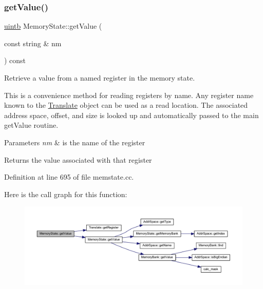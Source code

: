 \subsubsection{\texorpdfstring{getValue()}{getValue()}\hspace{0.1cm}{\footnotesize\ttfamily [2/3]}}
{\footnotesize\ttfamily \mbox{\hyperlink{types_8h_a2db313c5d32a12b01d26ac9b3bca178f}{uintb}} Memory\+State\+::get\+Value (\begin{DoxyParamCaption}\item[{const string \&}]{nm }\end{DoxyParamCaption}) const}



Retrieve a value from a named register in the memory state. 

This is a convenience method for reading registers by name. Any register name known to the \mbox{\hyperlink{class_translate}{Translate}} object can be used as a read location. The associated address space, offset, and size is looked up and automatically passed to the main get\+Value routine. 
\begin{DoxyParams}{Parameters}
{\em nm} & is the name of the register \\
\hline
\end{DoxyParams}
\begin{DoxyReturn}{Returns}
the value associated with that register 
\end{DoxyReturn}


Definition at line 695 of file memstate.\+cc.

Here is the call graph for this function\+:
\nopagebreak
\begin{figure}[H]
\begin{center}
\leavevmode
\includegraphics[width=350pt]{class_memory_state_af9ec8f86ed75b9b2f57c3351951ce5b1_cgraph}
\end{center}
\end{figure}
\mbox{\label{class_memory_state_a9b0f55b9ff7e228fd09e0b550e8479f2}} 
